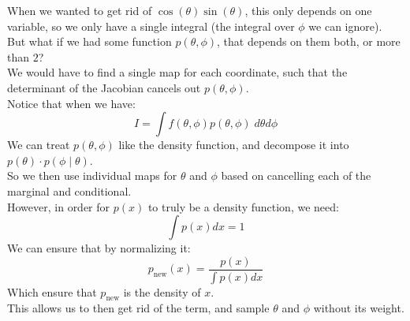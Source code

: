 \documentclass[12pt]{article}
\begin{document}
When we wanted to get rid of
$\cos(\theta)\sin(\theta)$,
this only depends on one variable, so
we only have a single integral (the integral
over $\phi$ we can ignore). \\

But what if we had some function $p(\theta, \phi)$,
that depends on them both, or more than $2$? \\

We would have to find a single map for each 
coordinate, such that the determinant of the Jacobian
cancels out $p(\theta, \phi)$. \\

Notice that when we have:
\[ I = \int f(\theta, \phi)p(\theta, \phi) 
\; d\theta d\phi \]
We can treat $p(\theta, \phi)$
like the density function, and decompose it
into $p(\theta) \cdot p(\phi \mid \theta)$. \\
So we then use individual
maps for $\theta$ and $\phi$
based on cancelling each of the marginal
and conditional. \\

However, in order for $p(x)$
to truly be a density function, we need:
\[ \int p(x)dx = 1 \]
We can ensure that by normalizing it:
\[ p_{\text{new}}(x) = \dfrac{p(x)}{\int p(x) dx} \]
Which ensure that $p_{\text{new}}$
is the density of $x$. \\ 

This allows us to then get rid of the term,
and sample $\theta$ and $\phi$ without
its weight. \\
\end{document}
